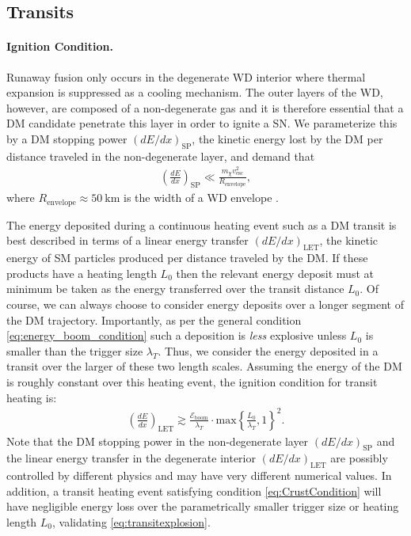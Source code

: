 \documentclass[preprintnumbers,amsmath,amssymb,prd,superscriptaddress]{revtex4}
\newcommand{\Eboom}{\mathcal{E}_\text{boom}}
\begin{document}

\subsection{Transits}

\paragraph{Ignition Condition.}
Runaway fusion only occurs in the degenerate WD interior where thermal expansion is suppressed as a cooling mechanism.
The outer layers of the WD, however, are composed of a non-degenerate gas and it is therefore essential that a DM candidate penetrate this layer in order to ignite a SN.
We parameterize this by a DM stopping power $(dE/dx)_\text{SP}$, the kinetic energy lost by the DM per distance traveled in the non-degenerate layer, and demand that
\begin{align}
\label{eq:CrustCondition}
  \left( \frac{d E}{d x} \right)_\text{SP} \ll
  \frac{m_\chi v^2_\text{esc}}{R_\text{envelope}},
\end{align}
where $R_\text{envelope} \approx 50 ~\text{km}$ is the width of a WD envelope \cite{KippenhahnWeigert}.

The energy deposited during a continuous heating event such as a DM transit is best described in terms of a linear energy transfer $(dE/dx)_\text{LET}$, the kinetic energy of SM particles produced per distance traveled by the DM.
If these products have a heating length $L_0$ then the relevant energy deposit must at minimum be taken as the energy transferred over the transit distance $L_0$.
Of course, we can always choose to consider energy deposits over a longer segment of the DM trajectory.
Importantly, as per the general condition \eqref{eq:energy_boom_condition} such a deposition is \emph{less} explosive unless $L_0$ is smaller than the trigger size $\lambda_T$.
Thus, we consider the energy deposited in a transit over the larger of these two length scales.
Assuming the energy of the DM is roughly constant over this heating event, the ignition condition for transit heating is:
\begin{align}
\label{eq:transitexplosion}
  \left( \frac{d E}{d x} \right)_\text{LET} \gtrsim
  \frac{\Eboom}{\lambda_T} \cdot \text{max}
  \left\{\frac{L_0}{\lambda_T}, 1 \right\}^2.
\end{align}
Note that the DM stopping power in the non-degenerate layer $(dE/dx)_\text{SP}$ and the linear energy transfer in the degenerate interior $(dE/dx)_\text{LET}$ are possibly controlled by different physics and may have very different numerical values.
In addition, a transit heating event satisfying condition \eqref{eq:CrustCondition} will have negligible energy loss over the parametrically smaller trigger size or heating length $L_0$, validating \eqref{eq:transitexplosion}.
\end{document}
